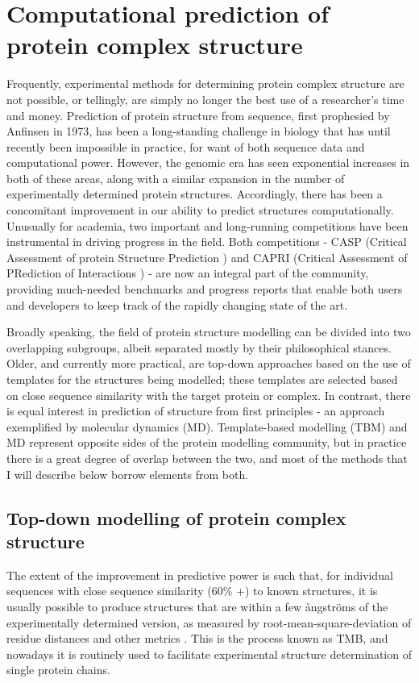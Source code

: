 \documentclass[a4paper,11pt,twoside,openright]{scrbook}
\begin{document}
\section{Computational prediction of protein complex structure}
Frequently, experimental methods for determining protein complex structure are not possible, or tellingly, are simply no longer the best use of a researcher's time and money. Prediction of protein structure from sequence, first prophesied by Anfinsen in 1973\cite{Anfinsen1973}, has been a long-standing challenge in biology that has until recently been impossible in practice, for want of both sequence data and computational power. However, the genomic era has seen exponential increases in both of these areas, along with a similar expansion in the number of experimentally determined protein structures. Accordingly, there has been a concomitant improvement in our ability to predict structures computationally. Unusually for academia, two important and long-running competitions have been instrumental in driving progress in the field. Both competitions - CASP (Critical Assessment of protein Structure Prediction \cite{Moult1995}) and CAPRI (Critical Assessment of PRediction of Interactions \cite{Janin2003}) - are now an integral part of the community, providing much-needed benchmarks and progress reports that enable both users and developers to keep track of the rapidly changing state of the art.

Broadly speaking, the field of protein structure modelling can be divided into two overlapping subgroups, albeit separated mostly by their philosophical stances. Older, and currently more practical, are top-down approaches based on the use of templates for the structures being modelled; these templates are selected based on close sequence similarity with the target protein or complex. In contrast, there is equal interest in prediction of structure from first principles - an approach exemplified by molecular dynamics (MD). Template-based modelling (TBM) and MD represent opposite sides of the protein modelling community, but in practice there is a great degree of overlap between the two, and most of the methods that I will describe below borrow elements from both.

\subsection{Top-down modelling of protein complex structure}
The extent of the improvement in predictive power is such that, for individual sequences with close sequence similarity (60\% +) to known structures, it is usually possible to produce structures that are within a few ångströms of the experimentally determined version, as measured by root-mean-square-deviation of residue distances and other metrics \cite{Haas2013,Moult2016}. This is the process known as TMB, and nowadays it is routinely used to facilitate experimental structure determination of single protein chains.
\end{document}
